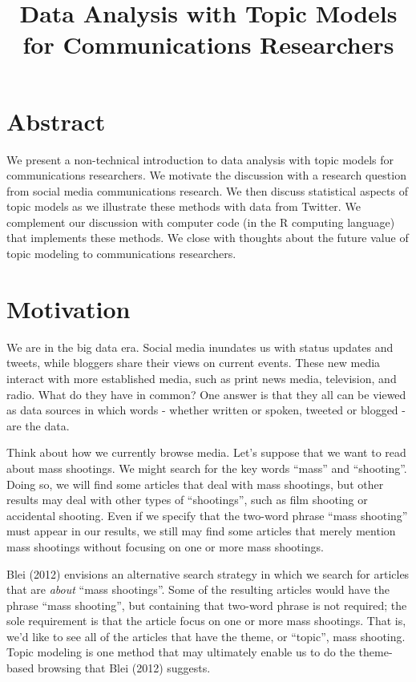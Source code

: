 \documentclass[12pt,]{article}
\title{Data Analysis with Topic Models for Communications Researchers}
\author{}
\date{}
\begin{document}
\maketitle

\pagestyle{fancy}

\listoftodos

\section{Abstract}\label{abstract}

We present a non-technical introduction to data analysis with topic
models for communications researchers. We motivate the discussion with a
research question from social media communications research. We then
discuss statistical aspects of topic models as we illustrate these
methods with data from Twitter. We complement our discussion with
computer code (in the R computing language) that implements these
methods. We close with thoughts about the future value of topic modeling
to communications researchers.

\section{Motivation}\label{motivation}


We are in the big data era. Social media inundates us with status
updates and tweets, while bloggers share their views on current events.
These new media interact with more established media, such as print news
media, television, and radio. What do they have in common? One answer is
that they all can be viewed as data sources in which words - whether
written or spoken, tweeted or blogged - are the data.

Think about how we currently browse media. Let's suppose that we want to
read about mass shootings. We might search for the key words ``mass''
and ``shooting''. Doing so, we will find some articles that deal with
mass shootings, but other results may deal with other types of
``shootings'', such as film shooting or accidental shooting. Even if we
specify that the two-word phrase ``mass shooting'' must appear in our
results, we still may find some articles that merely mention mass
shootings without focusing on one or more mass shootings.

Blei (2012) envisions an alternative search strategy in which we search
for articles that are \emph{about} ``mass shootings''. Some of the
resulting articles would have the phrase ``mass shooting'', but
containing that two-word phrase is not required; the sole requirement is
that the article focus on one or more mass shootings. That is, we'd like
to see all of the articles that have the theme, or ``topic'', mass
shooting. Topic modeling is one method that may ultimately enable us to
do the theme-based browsing that Blei (2012) suggests.
\end{document}
